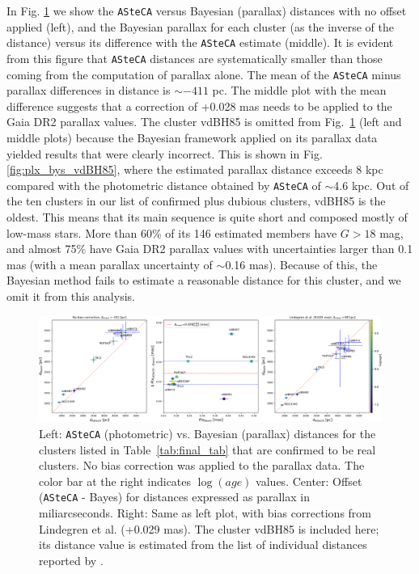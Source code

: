 \documentclass[draft]{aa}
\begin{document}
In Fig. \ref{fig:prlxbias} we show the \texttt{ASteCA} versus Bayesian 
(parallax) distances with no offset applied (left), and the Bayesian
parallax for each cluster (as the inverse of the distance) versus its
difference with the \texttt{ASteCA} estimate (middle).
%
It is evident from this figure that \texttt{ASteCA} distances are
systematically smaller than those coming from the computation of parallax
alone. The mean of the \texttt{ASteCA} minus parallax differences in
distance is $\sim-411$ pc.
The middle plot with the mean difference suggests that a correction of
+0.028 mas needs to be applied to the Gaia DR2 parallax values.
%
The cluster vdBH85 is omitted from Fig.~\ref{fig:prlxbias} (left and
middle plots) because the Bayesian framework applied on its parallax data
yielded results that were clearly incorrect. This is shown in Fig. 
\ref{fig:plx_bys_vdBH85}, where the estimated parallax distance exceeds 8 kpc compared with the photometric distance obtained by \texttt{ASteCA} of $\sim$4.6 kpc.
Out of the ten clusters in our list of confirmed plus dubious clusters, vdBH85
is the oldest. This means that its main sequence is quite short and
composed mostly of low-mass stars.
More than 60\% of its 146 estimated members have $G>18$ mag, and almost
75\% have Gaia DR2 parallax values with uncertainties larger than 0.1 mas 
(with a mean parallax uncertainty of $\sim$0.16 mas). Because of this, the
Bayesian method fails to estimate a reasonable distance for this cluster,
and we omit it from this analysis.\\

\begin{figure}[ht]
    \centering
    \includegraphics[width=\hsize]{../figs/dist_comparision.png}
\caption{Left: \texttt{ASteCA} (photometric) vs. Bayesian (parallax)
distances for the clusters listed in Table~\ref{tab:final_tab} that are
confirmed to be real clusters. No bias correction was applied to the parallax
data. The color bar at the right indicates $\log(age)$ values.
Center: Offset (\texttt{ASteCA} - Bayes) for distances expressed as
parallax in miliarcseconds.
Right: Same as left plot, with bias corrections from Lindegren et al.
(+0.029 mas).
The cluster vdBH85 is included here; its distance value is estimated from the
list of individual distances reported by \cite{BailerJones_2018}.
}
    \label{fig:prlxbias}
\end{figure}
\end{document}
